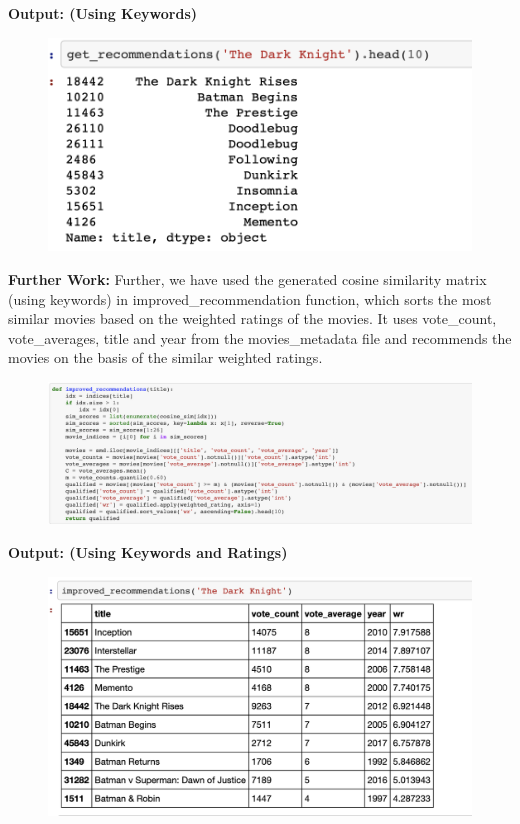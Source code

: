 \documentclass[10pt,conference]{IEEEtran}
\begin{document}
\begin{enumerate}
		\textbf{Output: (Using Keywords)}
		\begin{figure}[H]
			\centering
			\includegraphics[scale=.3]{rec_keyword.png}
			\label{fig:Keyword Output}
		\end{figure}
		\textbf{Further Work:}
		Further, we have used the generated cosine similarity matrix (using keywords) in improved\_recommendation function, which sorts the most similar movies based on the weighted ratings of the movies.
		It uses vote\_count, vote\_averages, title and year from the movies\_metadata file and recommends the movies on the basis of the similar weighted ratings.
		\begin{figure}[H]
			\centering
			\includegraphics[scale=.2]{ratings.png}
			\label{fig:Rating Recommendation}
		\end{figure}

		\textbf{Output: (Using Keywords and Ratings)}
		\begin{figure}[H]
			\centering
			\includegraphics[scale=.3]{rec_rating.png}
			\label{fig:Rating Output}
		\end{figure}
\end{enumerate}
\end{document}
